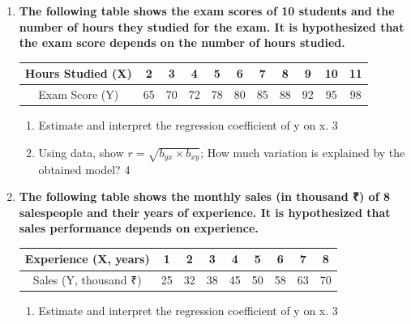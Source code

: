 \documentclass[a4paper,oneside]{book}
\begin{document}
\begin{enumerate}
  \begin{enumerate}
    \item  
	Make a scatter plot using the data and state the potential direction and strength of the relationship between the variables. \hfill 3
    \item
	Find the correlation and interpret. \hfill 4
  \end{enumerate}
 
  \item
	  \textbf{The following table shows the exam scores of 10 students and the number of hours they studied for the exam. It is hypothesized that the exam score depends on the number of hours studied.} 
	  
\begin{table}[h!]
\centering
\begin{tabular}{c|c|c|c|c|c|c|c|c|c|c}
Hours Studied (X) & 2 & 3 & 4 & 5 & 6 & 7 & 8 & 9 & 10 & 11 \\ \hline
Exam Score (Y) & 65 & 70 & 72 & 78 & 80 & 85 & 88 & 92 & 95 & 98 \\
\end{tabular}
\end{table}
  
  \begin{enumerate}
    \item  
	Estimate and interpret the regression coefficient of y on x. \hfill 3
    \item
	Using data, show $r = \sqrt{b_{yx} \times b_{xy}}$; How much variation is explained by the obtained model? \hfill 4
  \end{enumerate}
  
  \item
  \textbf{The following table shows the monthly sales (in thousand ₹) of 8 salespeople and their years of experience. It is hypothesized that sales performance depends on experience.}

\begin{table}[h!]
\centering
\begin{tabular}{c|c|c|c|c|c|c|c|c}
Experience (X, years) & 1 & 2 & 3 & 4 & 5 & 6 & 7 & 8 \\ \hline
Sales (Y, thousand ₹) & 25 & 32 & 38 & 45 & 50 & 58 & 63 & 70 \\
\end{tabular}
\end{table}

\begin{enumerate}
    \item
    Estimate and interpret the regression coefficient of y on x. \hfill 3
    

\end{enumerate}
\end{enumerate}
\end{document}

